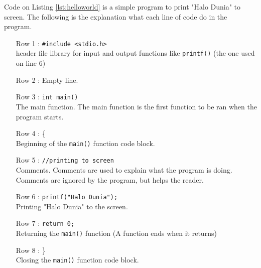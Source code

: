 Code on Listing \ref{lst:helloworld} is a simple program to print "Halo Dunia" to screen. The following is the explanation what each line of code do in the program.
\begin{itemize}\setlength\itemsep{-0.1em}
	\item [Row 1 :] \verb|#include <stdio.h>|\\ header file library for input and output functions like \verb|printf()| (the one used on line 6)
	\item[Row 2 :] Empty line.
	\item [Row 3 :] \verb|int main()|\\ The main function. The main function is the first function to be ran when the program starts.
	\item[Row 4 :] \{ \\Beginning of the \verb|main()| function code block.
		\item[Row 5 :]\verb|//printing to screen|\\ Comments. Comments are used to explain what the program is doing. Comments are ignored by the program, but helps the reader.
		\item[Row 6 :]\verb|printf("Halo Dunia");|\\ Printing "Halo Dunia" to the screen.
	\item[Row 7 :] \verb|return 0;| \\Returning the \verb|main()| function (A function ends when it returns)
	\item [Row 8 :] \}\\Closing the \verb|main()| function code block.



\end{itemize}

